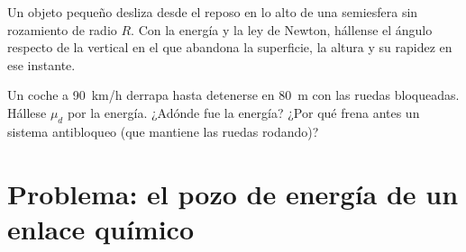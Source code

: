\begin{exercise}[$\star\star\star$]\label{exo:b1:work-and-energy:11}
Un objeto pequeño desliza desde el reposo en lo alto de una semiesfera sin
rozamiento de radio $R$. Con la energía y la ley de Newton, hállense el
ángulo respecto de la vertical en el que abandona la superficie, la altura
y su rapidez en ese instante.
\end{exercise}

\begin{exercise}[$\star\star\star$]\label{exo:b1:work-and-energy:12}
Un coche a \qty{90}{km/h} derrapa hasta detenerse en \qty{80}{m} con las
ruedas bloqueadas. Hállese $\mu_d$ por la energía. ¿Adónde fue la energía?
¿Por qué frena antes un sistema antibloqueo (que mantiene las ruedas rodando)?
\end{exercise}

\section{Problema: el pozo de energía de un enlace químico}

